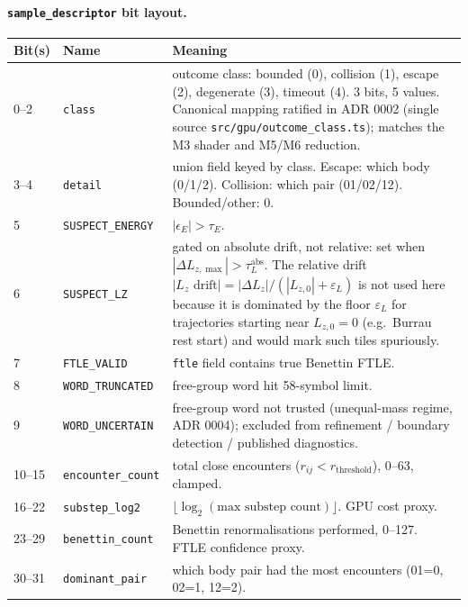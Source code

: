 \documentclass[11pt]{report}
\begin{document}
\paragraph{\texttt{sample\_descriptor} bit layout.}
\begin{center}
\begin{tabular}{llp{8.5cm}}
\toprule
Bit(s) & Name & Meaning \\
\midrule
0--2 & \texttt{class} & outcome class: bounded (0), collision (1), escape (2), degenerate (3), timeout (4). 3 bits, 5 values. Canonical mapping ratified in ADR 0002 (single source \texttt{src/gpu/outcome\_class.ts}); matches the M3 shader and M5/M6 reduction. \\
3--4 & \texttt{detail} & union field keyed by class. Escape: which body (0/1/2). Collision: which pair (01/02/12). Bounded/other: 0. \\
5 & \texttt{SUSPECT\_ENERGY} & $|\epsilon_E|>\tau_E$. \\
6 & \texttt{SUSPECT\_LZ} & gated on absolute drift, not relative: set when $|\Delta L_{z,\max}|>\tau_L^{\mathrm{abs}}$. The relative drift $|L_z\text{ drift}|=|\Delta L_z|/(|L_{z,0}|+\varepsilon_L)$ is not used here because it is dominated by the floor $\varepsilon_L$ for trajectories starting near $L_{z,0}=0$ (e.g.\ Burrau rest start) and would mark such tiles spuriously. \\
7 & \texttt{FTLE\_VALID} & \texttt{ftle} field contains true Benettin FTLE. \\
8 & \texttt{WORD\_TRUNCATED} & free-group word hit 58-symbol limit. \\
9 & \texttt{WORD\_UNCERTAIN} & free-group word not trusted (unequal-mass regime, ADR 0004); excluded from refinement / boundary detection / published diagnostics. \\
10--15 & \texttt{encounter\_count} & total close encounters ($r_{ij}<r_{\mathrm{threshold}}$), 0--63, clamped. \\
16--22 & \texttt{substep\_log2} & $\lfloor\log_2(\text{max substep count})\rfloor$. GPU cost proxy. \\
23--29 & \texttt{benettin\_count} & Benettin renormalisations performed, 0--127. FTLE confidence proxy. \\
30--31 & \texttt{dominant\_pair} & which body pair had the most encounters (01=0, 02=1, 12=2). \\
\bottomrule
\end{tabular}
\end{center}
\end{document}
